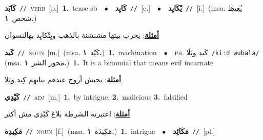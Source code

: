 \documentclass[10pt,a4paper,twoside]{article} %
\begin{document}
\begin{multicols}{2}
{\setlength\topsep{0pt}\textbf{\foreignlanguage{arabic}{كَايَد}}\ {\color{gray}\texttt{//}\color{black}}\ \textsc{verb}\ [p.]\ \textbf{1.}~tease sb\ \ $\bullet$\ \ \setlength\topsep{0pt}\textbf{\foreignlanguage{arabic}{كَايِد}}\ {\color{gray}\texttt{//}\color{black}}\ [c.]\ \ $\bullet$\ \ \setlength\topsep{0pt}\textbf{\foreignlanguage{arabic}{يْكَايِد}}\ {\color{gray}\texttt{//}\color{black}}\ [i.]\ \color{gray}(msa. \foreignlanguage{arabic}{يُغِيظ شخص}~\foreignlanguage{arabic}{\textbf{١.}})\color{black}\  \begin{flushright}\color{gray}\foreignlanguage{arabic}{\textbf{\underline{\foreignlanguage{arabic}{أمثلة}}}: يخرب بيتها  مشنشنة بالذهب وبِتْكايِد بهالنسوان}\end{flushright}\color{black}} \vspace{2mm}

{\setlength\topsep{0pt}\textbf{\foreignlanguage{arabic}{كَيد}}\ {\color{gray}\texttt{//}\color{black}}\ \textsc{noun}\ [m.]\ \color{gray}(msa. \foreignlanguage{arabic}{كَيْد}~\foreignlanguage{arabic}{\textbf{١.}})\color{black}\ \textbf{1.}~machination\ \ $\bullet$\ \ \textsc{ph.} \color{gray} \foreignlanguage{arabic}{كَيد وبَلَا}\color{black}\ {\color{gray}\texttt{/{\sffamily kiːd wubala}/}\color{black}}\ \color{gray} (msa. \foreignlanguage{arabic}{محور الشر}~\foreignlanguage{arabic}{\textbf{١.}})\color{black}\ \textbf{1.}~It is a binomial that means evil incarnate\  \begin{flushright}\color{gray}\foreignlanguage{arabic}{\textbf{\underline{\foreignlanguage{arabic}{أمثلة}}}: بحبش أروح عندهم بناتهم كِيد وبَلا}\end{flushright}\color{black}} \vspace{2mm}

{\setlength\topsep{0pt}\textbf{\foreignlanguage{arabic}{كَيْدِي}}\ {\color{gray}\texttt{//}\color{black}}\ \textsc{adj}\ [m.]\ \textbf{1.}~by intrigue.  \textbf{2.}~malicious  \textbf{3.}~falsified\  \begin{flushright}\color{gray}\foreignlanguage{arabic}{\textbf{\underline{\foreignlanguage{arabic}{أمثلة}}}: اعتبرته الشرطة بلاغ كَيْدِي مش أكثر}\end{flushright}\color{black}} \vspace{2mm}

{\setlength\topsep{0pt}\textbf{\foreignlanguage{arabic}{مَكِيدِة}}\ {\color{gray}\texttt{//}\color{black}}\ \textsc{noun}\ [f.]\ \color{gray}(msa. \foreignlanguage{arabic}{مَكِيدَة}~\foreignlanguage{arabic}{\textbf{١.}})\color{black}\ \textbf{1.}~intrigue\ \ $\bullet$\ \ \setlength\topsep{0pt}\textbf{\foreignlanguage{arabic}{مَكَائِد}}\ {\color{gray}\texttt{//}\color{black}}\ [pl.]\ } \vspace{2mm}


\end{multicols}
\end{document}
